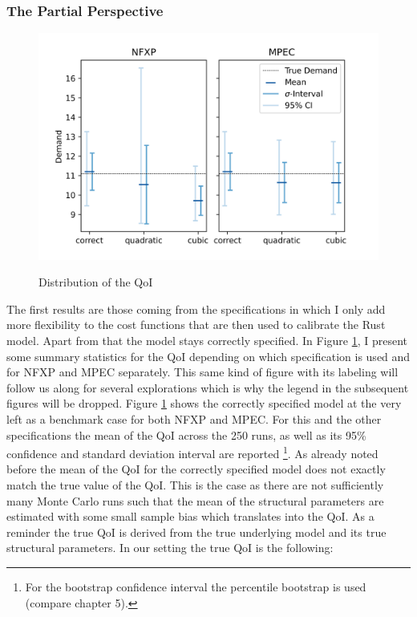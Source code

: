 \subsubsection{The Partial Perspective}

\begin{figure}[!b]
	\caption{Distribution of the QoI}
	\vspace*{-4mm}
	\centering
	\includegraphics[scale=0.9]{../figures/figure_5.png}
	\label{figure5}
\end{figure}

The first results are those coming from the specifications in which I only add more flexibility to the cost functions that are then used to calibrate the Rust model. Apart from that the model stays correctly specified. In Figure \ref{figure5}, I present some summary statistics for the QoI depending on which specification is used and for NFXP and MPEC separately. This same kind of figure with its labeling will follow us along for several explorations which is why the legend in the subsequent figures will be dropped. Figure \ref{figure5} shows the correctly specified model at the very left as a benchmark case for both NFXP and MPEC. For this and the other specifications the mean of the QoI across the 250 runs, as well as its 95\% confidence and standard deviation interval are reported \footnote{For the bootstrap confidence interval the percentile bootstrap is used (compare \cite{Davison.1997} chapter 5).}. As already noted before the mean of the QoI for the correctly specified model does not exactly match the true value of the QoI. This is the case as there are not sufficiently many Monte Carlo runs such that the mean of the structural parameters are estimated with some small sample bias which translates into the QoI. As a reminder the true QoI is derived from the true underlying model and its true structural parameters. In our setting the true QoI is the following:

